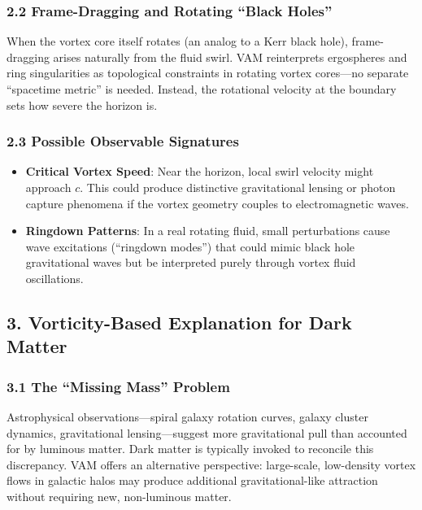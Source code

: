 \subsubsection*{2.2 Frame-Dragging and Rotating “Black Holes”}
When the vortex core itself rotates (an analog to a Kerr black hole), frame-dragging arises naturally from the fluid swirl. VAM reinterprets ergospheres and ring singularities as topological constraints in rotating vortex cores—no separate “spacetime metric” is needed. Instead, the rotational velocity at the boundary sets how severe the horizon is.

\subsubsection*{2.3 Possible Observable Signatures}
\begin{itemize}
    \item \textbf{Critical Vortex Speed}: Near the horizon, local swirl velocity might approach \(c\). This could produce distinctive gravitational lensing or photon capture phenomena if the vortex geometry couples to electromagnetic waves.
    \item \textbf{Ringdown Patterns}: In a real rotating fluid, small perturbations cause wave excitations (“ringdown modes”) that could mimic black hole gravitational waves but be interpreted purely through vortex fluid oscillations.
\end{itemize}

\subsection*{3. Vorticity-Based Explanation for Dark Matter}

\subsubsection*{3.1 The “Missing Mass” Problem}
Astrophysical observations—spiral galaxy rotation curves, galaxy cluster dynamics, gravitational lensing—suggest more gravitational pull than accounted for by luminous matter. Dark matter is typically invoked to reconcile this discrepancy. VAM offers an alternative perspective: large-scale, low-density vortex flows in galactic halos may produce additional gravitational-like attraction without requiring new, non-luminous matter.

